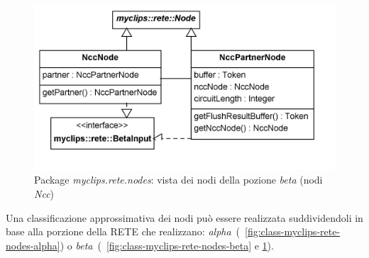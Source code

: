 \begin{figure}
\centering
\includegraphics[width=1\textwidth]{Immagini/Capitolo3/Classi/myclips_rete_nodes_Ncc-Partner-Nodes.png}
\caption{Package \emph{myclips.rete.nodes}: vista dei nodi della pozione \emph{beta} (nodi \emph{Ncc})}\label{fig:class-myclips-rete-nodes-beta-ncc}
\end{figure}


Una classificazione approssimativa dei nodi può essere realizzata suddividendoli in base alla porzione della RETE che realizzano: \emph{alpha}~(\figurename~\ref{fig:class-myclips-rete-nodes-alpha}) o \emph{beta}~(\figurename~\ref{fig:class-myclips-rete-nodes-beta} e \ref{fig:class-myclips-rete-nodes-beta-ncc}). 

